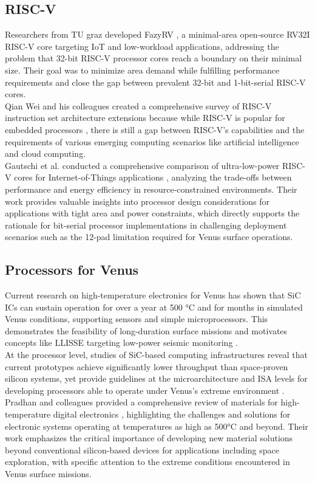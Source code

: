 \documentclass[10pt,twocolumn]{article}
\begin{document}
\subsection{RISC-V}
Researchers from TU graz developed FazyRV \cite{kissich2024fazyrv}, a minimal-area open-source RV32I RISC-V core targeting IoT and low-workload applications, addressing the problem that 32-bit RISC-V processor cores reach a boundary on their minimal size. Their goal was to minimize area demand while fulfilling performance requirements and close the gap between prevalent 32-bit and 1-bit-serial RISC-V cores.\\
Qian Wei and his colleagues created a comprehensive survey of RISC-V instruction set architecture extensions because while RISC-V is popular for embedded processors \cite{cui2023riscv}, there is still a gap between RISC-V's capabilities and the requirements of various emerging computing scenarios like artificial intelligence and cloud computing.\\
Gautschi et al. conducted a comprehensive comparison of ultra-low-power RISC-V cores for Internet-of-Things applications \cite{gautschi2017slow}, analyzing the trade-offs between performance and energy efficiency in resource-constrained environments. Their work provides valuable insights into processor design considerations for applications with tight area and power constraints, which directly supports the rationale for bit-serial processor implementations in challenging deployment scenarios such as the 12-pad limitation required for Venus surface operations.

\subsection{Processors for Venus}
Current research on high-temperature electronics for Venus has shown that SiC ICs can sustain operation for over a year at 500 °C and for months in simulated Venus conditions, supporting sensors and simple microprocessors. This demonstrates the feasibility of long-duration surface missions and motivates concepts like LLISSE targeting low-power seismic monitoring \cite{kim2022sic}. \\
At the processor level, studies of SiC-based computing infrastructures reveal that current prototypes achieve significantly lower throughput than space-proven silicon systems, yet provide guidelines at the microarchitecture and ISA levels for developing processors able to operate under Venus's extreme environment \cite{kremic2021temperature}.\\
Pradhan and colleagues provided a comprehensive review of materials for high-temperature digital electronics \cite{pradhan2024materials}, highlighting the challenges and solutions for electronic systems operating at temperatures as high as 500°C and beyond. Their work emphasizes the critical importance of developing new material solutions beyond conventional silicon-based devices for applications including space exploration, with specific attention to the extreme conditions encountered in Venus surface missions.
\end{document}
